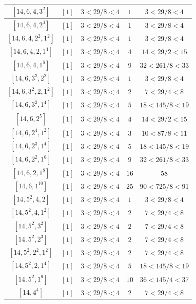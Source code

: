 \documentclass{article}%
\begin{document}
\begin{center}
\begin{longtable}{||c|c|c|c|c||}
$[14, 6, 4, 3^{2}]$ & $[1]$ & $3 < 29/8 < 4$ & $1$ & $3 < 29/8 < 4$ \\ \hline 
$[14, 6, 4, 2^{3}]$ & $[1]$ & $3 < 29/8 < 4$ & $1$ & $3 < 29/8 < 4$ \\ \hline 
$[14, 6, 4, 2^{2}, 1^{2}]$ & $[1]$ & $3 < 29/8 < 4$ & $1$ & $3 < 29/8 < 4$ \\ \hline 
$[14, 6, 4, 2, 1^{4}]$ & $[1]$ & $3 < 29/8 < 4$ & $4$ & $14 < 29/2 < 15$ \\ \hline 
$[14, 6, 4, 1^{6}]$ & $[1]$ & $3 < 29/8 < 4$ & $9$ & $32 < 261/8 < 33$ \\ \hline 
$[14, 6, 3^{2}, 2^{2}]$ & $[1]$ & $3 < 29/8 < 4$ & $1$ & $3 < 29/8 < 4$ \\ \hline 
$[14, 6, 3^{2}, 2, 1^{2}]$ & $[1]$ & $3 < 29/8 < 4$ & $2$ & $7 < 29/4 < 8$ \\ \hline 
$[14, 6, 3^{2}, 1^{4}]$ & $[1]$ & $3 < 29/8 < 4$ & $5$ & $18 < 145/8 < 19$ \\ \hline 
$[14, 6, 2^{5}]$ & $[1]$ & $3 < 29/8 < 4$ & $4$ & $14 < 29/2 < 15$ \\ \hline 
$[14, 6, 2^{4}, 1^{2}]$ & $[1]$ & $3 < 29/8 < 4$ & $3$ & $10 < 87/8 < 11$ \\ \hline 
$[14, 6, 2^{3}, 1^{4}]$ & $[1]$ & $3 < 29/8 < 4$ & $5$ & $18 < 145/8 < 19$ \\ \hline 
$[14, 6, 2^{2}, 1^{6}]$ & $[1]$ & $3 < 29/8 < 4$ & $9$ & $32 < 261/8 < 33$ \\ \hline 
$[14, 6, 2, 1^{8}]$ & $[1]$ & $3 < 29/8 < 4$ & $16$ & $58$ \\ \hline 
$[14, 6, 1^{10}]$ & $[1]$ & $3 < 29/8 < 4$ & $25$ & $90 < 725/8 < 91$ \\ \hline 
$[14, 5^{2}, 4, 2]$ & $[1]$ & $3 < 29/8 < 4$ & $1$ & $3 < 29/8 < 4$ \\ \hline 
$[14, 5^{2}, 4, 1^{2}]$ & $[1]$ & $3 < 29/8 < 4$ & $2$ & $7 < 29/4 < 8$ \\ \hline 
$[14, 5^{2}, 3^{2}]$ & $[1]$ & $3 < 29/8 < 4$ & $2$ & $7 < 29/4 < 8$ \\ \hline 
$[14, 5^{2}, 2^{3}]$ & $[1]$ & $3 < 29/8 < 4$ & $2$ & $7 < 29/4 < 8$ \\ \hline 
$[14, 5^{2}, 2^{2}, 1^{2}]$ & $[1]$ & $3 < 29/8 < 4$ & $2$ & $7 < 29/4 < 8$ \\ \hline 
$[14, 5^{2}, 2, 1^{4}]$ & $[1]$ & $3 < 29/8 < 4$ & $5$ & $18 < 145/8 < 19$ \\ \hline 
$[14, 5^{2}, 1^{6}]$ & $[1]$ & $3 < 29/8 < 4$ & $10$ & $36 < 145/4 < 37$ \\ \hline 
$[14, 4^{4}]$ & $[1]$ & $3 < 29/8 < 4$ & $2$ & $7 < 29/4 < 8$ \\ \hline 

\end{longtable}
\end{center}
\end{document}
